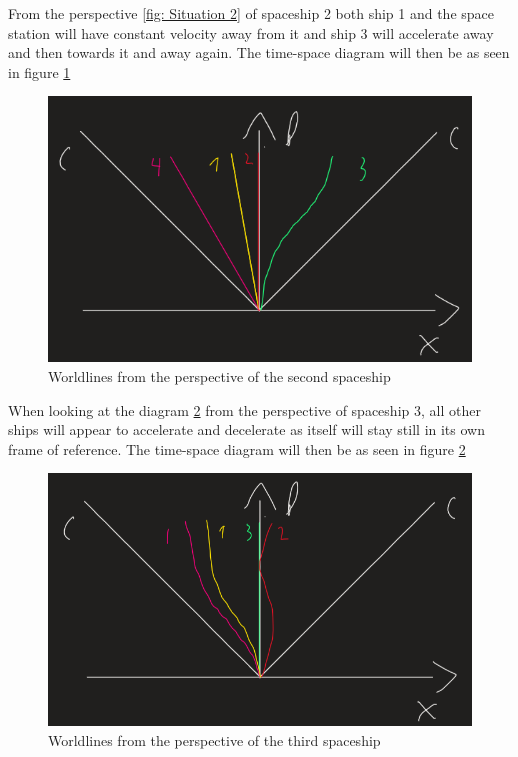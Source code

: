 \documentclass[reprint,english,notitlepage]{revtex4-2}
\begin{document}
  From the perspective \ref{fig: Situation 2} of spaceship 2 both ship 1 and the space station will have constant velocity away from it and ship 3 will accelerate away and then towards it and away again. The time-space diagram will then be as seen in figure \ref{fig: Perspective 2}
  \begin{figure}[h!]
    \centering
    \includegraphics[scale = .5]{figures/4.2.3.png}
    \caption{Worldlines from the perspective of the second spaceship}
    \label{fig: Perspective 2}
  \end{figure}
  
  When looking at the diagram \ref{fig: Perspective 3} from the perspective of spaceship 3, all other ships will appear to accelerate and decelerate as itself will stay still in its own frame of reference. The time-space diagram will then be as seen in figure \ref{fig: Perspective 3} 
  \begin{figure}[h!]
    \centering
    \includegraphics[scale = .5]{figures/4.5.png}
    \caption{Worldlines from the perspective of the third spaceship}
    \label{fig: Perspective 3}
  \end{figure}
  
\end{document}
